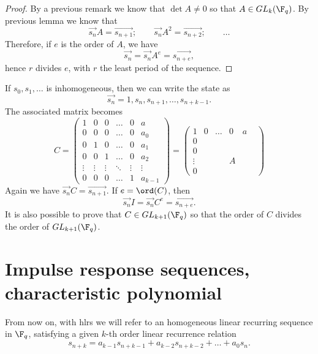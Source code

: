 \begin{proof}
	By a previous remark we know that \(\det A \neq 0\) so that \(A\in GL_k(\F_q)\). By previous lemma we know that
	\[
		\vec{s_n}A = \vec{s_{n+1}}; \qquad \vec{s_n}A^2 = \vec{s_{n+2}}; \qquad \ldots
	\]
	Therefore, if \(e\) is the order of \(A\), we have
	\[
		\vec{s_n} = \vec{s_n}A^e = \vec{s_{n+e}},
	\]
	hence \(r\) divides \(e\), with \(r\) the least period of the sequence.
\end{proof}

\begin{oss}
	If \(s_0,s_1,\ldots\) is inhomogeneous, then we can write the state as
	\[
		\vec{s_n} = 1,s_n,s_{n+1},\ldots,s_{n+k-1}.
	\]
	The associated matrix becomes
	\[
		C = 
		\begin{pmatrix}
			1      & 0      & 0      & \ldots & 0      & a       \\
			0      & 0      & 0      & \ldots & 0      & a_0     \\
			0      & 1      & 0      & \ldots & 0      & a_1     \\
			0      & 0      & 1      & \ldots & 0      & a_2     \\
			\vdots & \vdots & \vdots & \ddots & \vdots & \vdots  \\
			0      & 0      & 0      & \ldots & 1      & a_{k-1}
		\end{pmatrix} = 
		\begin{pmatrix}
			1      & 0 & \ldots & 0 & a     \\
			0      &   &        &   &   &   \\
			0      &   &        &   &   &   \\
			\vdots &   &        & A &   &   \\
			0      &   &        &   &   & 
		\end{pmatrix}
	\]
	Again we have \(\vec{s_n}C = \vec{s_{n+1}}\). If \(e=\ord(C)\), then
	\[
		\vec{s_n} I = \vec{s_n}C^e = \vec{s_{n+e}}.
	\]
	It is also possible to prove that \(C\in GL_{k+1}(\F_q)\) so that the order of \(C\) divides the order of \(GL_{k+1}(\F_q)\).
\end{oss}
%
%
\section{Impulse response sequences, characteristic polynomial}

From now on, with hlrs we will refer to an homogeneous linear recurring sequence in \(\F_q\), satisfying a given \(k\)-th order linear recurrence relation
\[\label{recrel}
	s_{n+k} = a_{k-1}s_{n+k-1} + a_{k-2}s_{n+k-2} + \ldots + a_0 s_n.\tag{\(*\)}
\]

